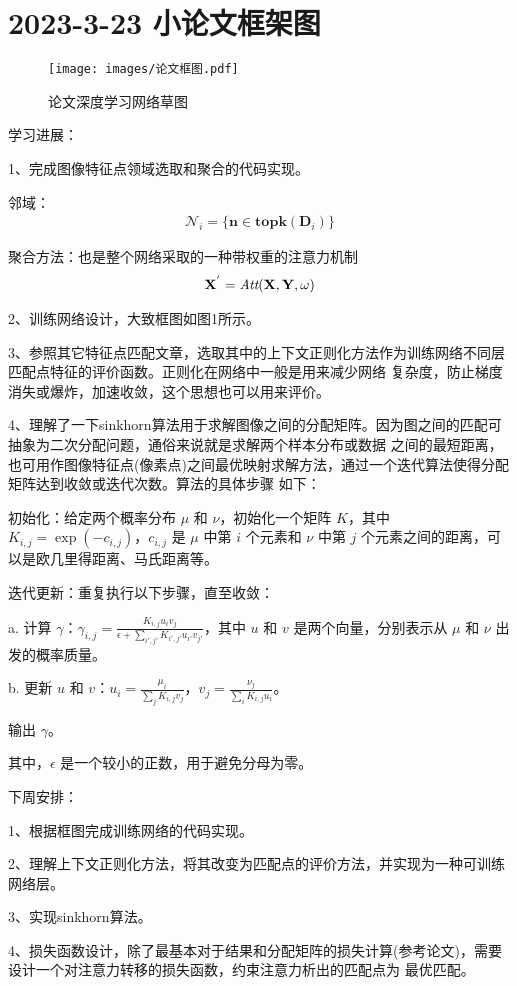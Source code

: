 \documentclass[10pt,a4paper]{article}
\begin{document}
\tableofcontents %
\newpage

\section{2023-3-23 小论文框架图}

\begin{figure}[!htb]
\texttt{[image: images/论文框图.pdf]}
\caption{论文深度学习网络草图}
\end{figure}

学习进展：

1、完成图像特征点领域选取和聚合的代码实现。

邻域：
\begin{align}
   \mathcal{N}_i=\{\mathbf{n}\in \mathbf{topk}(\mathbf{D}_i)\}
\end{align}

聚合方法：也是整个网络采取的一种带权重的注意力机制
\begin{align}
   \mathbf{X}^{'}=\mathbf{\emph{Att}}(\mathbf{X},\mathbf{Y},\mathbf{\omega}) 
\end{align}

2、训练网络设计，大致框图如图1所示。

3、参照其它特征点匹配文章，选取其中的上下文正则化方法作为训练网络不同层匹配点特征的评价函数。正则化在网络中一般是用来减少网络
复杂度，防止梯度消失或爆炸，加速收敛，这个思想也可以用来评价。

4、理解了一下sinkhorn算法用于求解图像之间的分配矩阵。因为图之间的匹配可抽象为二次分配问题，通俗来说就是求解两个样本分布或数据
之间的最短距离，也可用作图像特征点(像素点)之间最优映射求解方法，通过一个迭代算法使得分配矩阵达到收敛或迭代次数。算法的具体步骤
如下：

初始化：给定两个概率分布 $\mu$ 和 $\nu$，初始化一个矩阵 $K$，其中 $K_{i,j} = \exp(-c_{i,j})$，$c_{i,j}$ 是 $\mu$ 中第
$i$ 个元素和 $\nu$ 中第 $j$ 个元素之间的距离，可以是欧几里得距离、马氏距离等。

迭代更新：重复执行以下步骤，直至收敛：

\qquad a. 计算 $\gamma$：$\gamma_{i,j}=\frac{K_{i,j}u_i v_j}{\epsilon+\sum_{i',j'}K_{i',j'}u_{i'}v_{j'}}$，其中 $u$ 和
 $v$ 是两个向量，分别表示从 $\mu$ 和 $\nu$ 出发的概率质量。

\qquad b. 更新 $u$ 和 $v$：$u_i=\frac{\mu_i}{\sum_j K_{i,j}v_j}$，$v_j=\frac{\nu_j}{\sum_i K_{i,j}u_i}$。

输出 $\gamma$。

其中，$\epsilon$ 是一个较小的正数，用于避免分母为零。

下周安排：

1、根据框图完成训练网络的代码实现。

2、理解上下文正则化方法，将其改变为匹配点的评价方法，并实现为一种可训练网络层。

3、实现sinkhorn算法。

4、损失函数设计，除了最基本对于结果和分配矩阵的损失计算(参考论文)，需要设计一个对注意力转移的损失函数，约束注意力析出的匹配点为
最优匹配。
\end{document}
